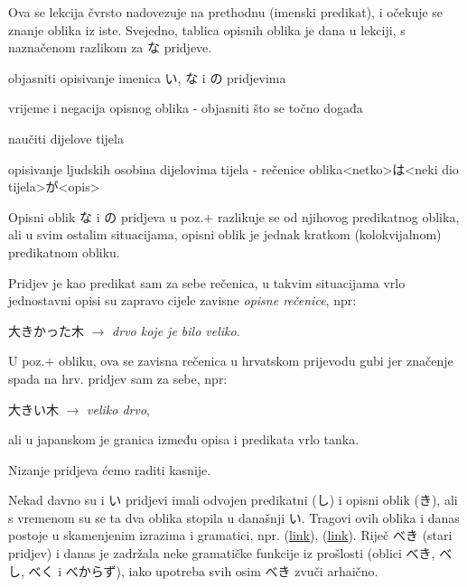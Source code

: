 
\author{Tomislav Mamić}

	
	Ova se lekcija čvrsto nadovezuje na prethodnu (imenski predikat), i očekuje se znanje oblika iz iste. Svejedno, tablica opisnih oblika je dana u lekciji, s naznačenom razlikom za な pridjeve.
	
	\begin{hyou}
		\item objasniti opisivanje imenica い, な i の pridjevima
		\item vrijeme i negacija opisnog oblika - objasniti što se točno događa
		\item naučiti dijelove tijela
		\item opisivanje ljudskih osobina dijelovima tijela - rečenice oblika\newline <netko>は<neki dio tijela>が<opis>
	\end{hyou}

	\fukudai{Napomene}
	\begin{hyou}
		\item Opisni oblik な i の pridjeva u poz.+ razlikuje se od njihovog predikatnog oblika, ali u svim ostalim situacijama, opisni oblik je jednak kratkom (kolokvijalnom) predikatnom obliku.
		\item Pridjev je kao predikat sam za sebe rečenica, u takvim situacijama vrlo jednostavni opisi su zapravo cijele zavisne \textit{opisne rečenice}, npr:
		
		大きかった木 $\rightarrow$ \textit{drvo koje je bilo veliko}.
		
		U poz.+ obliku, ova se zavisna rečenica u hrvatskom prijevodu gubi jer značenje spada na hrv. pridjev sam za sebe, npr:
		
		大きい木 $\rightarrow$ \textit{veliko drvo},
		
		ali u japanskom je granica između opisa i predikata vrlo tanka.
		\item Nizanje pridjeva ćemo raditi kasnije.
	\end{hyou}

	
	Nekad davno su i い pridjevi imali odvojen predikatni (し) i opisni oblik (き), ali s vremenom su se ta dva oblika stopila u današnji い. Tragovi ovih oblika i danas postoje u skamenjenim izrazima i gramatici, npr. (\href{https://jisho.org/search/osorubeshi}{link}), (\href{https://jisho.org/search/arumajiki}{link}). Riječ べき (stari pridjev) i danas je zadržala neke gramatičke funkcije iz prošlosti (oblici べき, べし, べく i べからず), iako upotreba svih osim べき zvuči arhaično.
